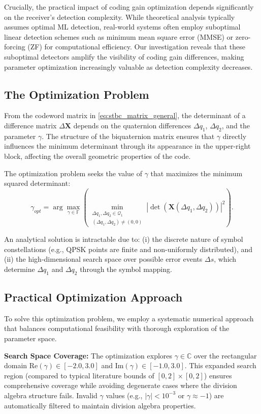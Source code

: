 Crucially, the practical impact of coding gain optimization depends significantly on the receiver's detection complexity. 
While theoretical analysis typically assumes optimal ML detection, real-world systems often employ suboptimal linear detection schemes such as minimum mean square error (MMSE) or zero-forcing (ZF) for computational efficiency.
Our investigation reveals that these suboptimal detectors amplify the visibility of coding gain differences, making parameter optimization increasingly valuable as detection complexity decreases.

\subsection{The Optimization Problem}
From the codeword matrix in \eqref{eq:stbc_matrix_general}, the determinant of a difference matrix $\Delta\mathbf{X}$ depends on the quaternion differences $\Delta q_1$, $\Delta q_2$, and the parameter $\gamma$. The structure of the biquaternion matrix ensures that $\gamma$ directly influences the minimum determinant through its appearance in the upper-right block, affecting the overall geometric properties of the code.

The optimization problem seeks the value of $\gamma$ that maximizes the minimum squared determinant:
\begin{equation} \label{eq:optimization}
\gamma_{opt} = \arg \max_{\gamma \in \mathbb{F}} \left( \min_{\substack{\Delta q_1, \Delta q_2 \in \mathcal{Q}_1 \\ (\Delta q_1, \Delta q_2) \neq (0,0)}} |\det(\mathbf{X}(\Delta q_1, \Delta q_2))|^2 \right).
\end{equation}

An analytical solution is intractable due to: 
(i) the discrete nature of symbol constellations (e.g., QPSK points are finite and non-uniformly distributed), and 
(ii) the high-dimensional search space over possible error events $\Delta s$, which determine $\Delta q_1$ and $\Delta q_2$ through the symbol mapping.

\subsection{Practical Optimization Approach}
To solve this optimization problem, we employ a systematic numerical approach that balances computational feasibility with thorough exploration of the parameter space.

\textbf{Search Space Coverage:} The optimization explores $\gamma \in \mathbb{C}$ over the rectangular domain $\text{Re}(\gamma) \in [-2.0, 3.0]$ and $\text{Im}(\gamma) \in [-1.0, 3.0]$. This expanded search region (compared to typical literature bounds of $[0, 2] \times [0, 2]$) ensures comprehensive coverage while avoiding degenerate cases where the division algebra structure fails. Invalid $\gamma$ values (e.g., $|\gamma| < 10^{-3}$ or $\gamma \approx -1$) are automatically filtered to maintain division algebra properties.

